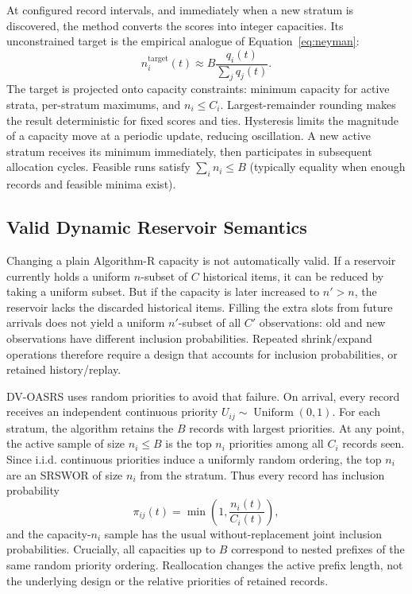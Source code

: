 \documentclass[11pt]{article}
\begin{document}
At configured record intervals, and immediately when a new stratum is discovered, the method converts the scores into integer capacities. Its unconstrained target is the empirical analogue of Equation~\ref{eq:neyman}:
\begin{equation}
 n_i^{\mathrm{target}}(t)\approx B\frac{q_i(t)}{\sum_jq_j(t)}.
\end{equation}
The target is projected onto capacity constraints: minimum capacity for active strata, per-stratum maximums, and $n_i\le C_i$. Largest-remainder rounding makes the result deterministic for fixed scores and ties. Hysteresis limits the magnitude of a capacity move at a periodic update, reducing oscillation. A new active stratum receives its minimum immediately, then participates in subsequent allocation cycles. Feasible runs satisfy $\sum_i n_i\le B$ (typically equality when enough records and feasible minima exist).

\subsection{Valid Dynamic Reservoir Semantics}

Changing a plain Algorithm-R capacity is not automatically valid. If a reservoir currently holds a uniform $n$-subset of $C$ historical items, it can be reduced by taking a uniform subset. But if the capacity is later increased to $n'>n$, the reservoir lacks the discarded historical items. Filling the extra slots from future arrivals does not yield a uniform $n'$-subset of all $C'$ observations: old and new observations have different inclusion probabilities. Repeated shrink/expand operations therefore require a design that accounts for inclusion probabilities, or retained history/replay.

DV-OASRS uses random priorities to avoid that failure. On arrival, every record receives an independent continuous priority $U_{ij}\sim\operatorname{Uniform}(0,1)$. For each stratum, the algorithm retains the $B$ records with largest priorities. At any point, the active sample of size $n_i\le B$ is the top $n_i$ priorities among all $C_i$ records seen. Since i.i.d. continuous priorities induce a uniformly random ordering, the top $n_i$ are an SRSWOR of size $n_i$ from the stratum. Thus every record has inclusion probability
\begin{equation}
 \pi_{ij}(t)=\min\left(1,\frac{n_i(t)}{C_i(t)}\right),
\end{equation}
and the capacity-$n_i$ sample has the usual without-replacement joint inclusion probabilities. Crucially, all capacities up to $B$ correspond to nested prefixes of the same random priority ordering. Reallocation changes the active prefix length, not the underlying design or the relative priorities of retained records.
\end{document}
